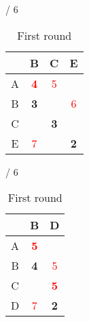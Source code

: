 \documentclass[a4paper, 11 pt, article, accentcolor=tud7b]{tudreport}
\begin{document}
\begin{table}[h]
    \hfill
	  \begin{subtable}[b]{\textwidth / 6}
	    \begin{tabular}{| c | c | c | c |}
	    \hline
	      & B                   & C           & E           \\ \hline
	    A & \textbf{\textcolor{red}{4}} & \textcolor{red}{5}  &             \\ \hline
	    B & \textbf{3}          &             & \textcolor{red}{6}  \\ \hline
	    C &                     & \textbf{3}  &             \\ \hline
	    E & \textcolor{red}{7}          &             & \textbf{2}  \\ \hline
	    \end{tabular}
	    \caption{$D^{D}$}
	  \end{subtable}
	  \hfill
	  \begin{subtable}[b]{\textwidth / 6}
	    \begin{tabular}{| c | c | c |}
	    \hline
	      & B                   & D                    \\ \hline
	    A & \textbf{\textcolor{red}{5}} &                      \\ \hline
	    B & \textbf{4}          & \textcolor{red}{5}           \\ \hline
	    C &                     & \textbf{\textcolor{red}{5}}  \\ \hline
	    D & \textcolor{red}{7}          & \textbf{2}           \\ \hline
	    \end{tabular}
	    \caption{$D^{E}$}
	  \end{subtable}
	  \caption{First round}
	\end{table}
	
\end{document}
